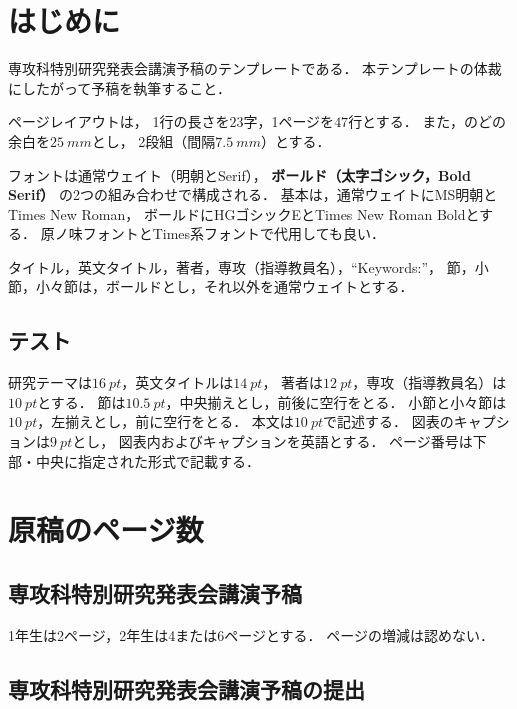 \documentclass[
	fonts=word
	\ifdefined\kanjiskip , dvipdfmx \fi
]{ac-resume}
\begin{document}
\color{red}
\maketitle

\section{はじめに}

専攻科特別研究発表会講演予稿のテンプレートである．
本テンプレートの体裁にしたがって予稿を執筆すること．

ページレイアウトは，
1行の長さを$23$字，1ページを$47$行とする．
また，のどの余白を$\SI{25}{mm}$とし，
2段組（間隔$\SI{7.5}{mm}$）とする．

フォントは通常ウェイト（明朝とSerif），
\textbf{ボールド（太字ゴシック，Bold Serif）}
の2つの組み合わせで構成される．
基本は，通常ウェイトにMS明朝とTimes New Roman，
ボールドにHGゴシックEとTimes New Roman Boldとする．
原ノ味フォントとTimes系フォントで代用しても良い．

タイトル，英文タイトル，著者，専攻（指導教員名），``Keywords:''，
節，小節，小々節は，ボールドとし，それ以外を通常ウェイトとする．

\subsection{テスト}

研究テーマは$\SI{16}{pt}$，英文タイトルは$\SI{14}{pt}$，
著者は$\SI{12}{pt}$，専攻（指導教員名）は$\SI{10}{pt}$とする．
節は$\SI{10.5}{pt}$，中央揃えとし，前後に空行をとる．
小節と小々節は$\SI{10}{pt}$，左揃えとし，前に空行をとる．
本文は$\SI{10}{pt}$で記述する．
図表のキャプションは$\SI{9}{pt}$とし，
図表内およびキャプションを英語とする．
ページ番号は下部・中央に指定された形式で記載する．

\section{原稿のページ数}

\subsection{専攻科特別研究発表会講演予稿}

1年生は2ページ，2年生は4または6ページとする．
ページの増減は認めない．

\subsection{専攻科特別研究発表会講演予稿の提出}
\end{document}
